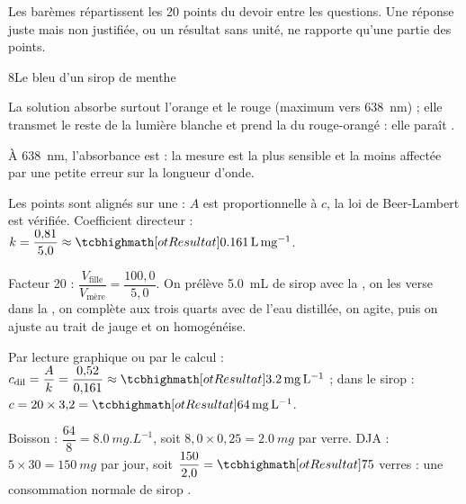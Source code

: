 
{\otLight\fontsize{8.5}{11.5}\selectfont\color{otMuted}\noindent Les barèmes répartissent les 20 points du devoir entre les
questions. Une réponse juste mais non justifiée, ou un résultat sans unité, ne rapporte qu'une partie des points.\par}

\begin{corrigeBac}{8}{Le bleu d'un sirop de menthe}
\begin{questions}
\item La solution absorbe surtout l'orange et le rouge (maximum vers \qty{638}{nm}) ; elle transmet le reste de la lumière blanche
et prend la  du rouge-orangé : elle paraît . \pts{1 pt}
\item À \qty{638}{nm}, l'absorbance est  : la mesure est la plus sensible et la moins affectée par une petite
erreur sur la longueur d'onde. \pts{1 pt}
\item Les points sont alignés sur une  : $A$ est proportionnelle à $c$, la loi de Beer-Lambert
est vérifiée. Coefficient directeur : $k=\dfrac{0{,}81}{5{,}0}\approx\res{\qty{0,161}{L.mg^{-1}}}$. 
\item Facteur 20 : $\dfrac{V_\text{fille}}{V_\text{mère}}=\dfrac{100{,}0}{5{,}0}$. On prélève \qty{5,0}{mL} de sirop avec la ,
on les verse dans la , on complète aux trois quarts avec de l'eau distillée, on agite, puis on
ajuste au trait de jauge et on homogénéise. 
\item Par lecture graphique ou par le calcul : $c_\text{dil}=\dfrac{A}{k}=\dfrac{0{,}52}{0{,}161}\approx\res{\qty{3,2}{mg.L^{-1}}}$ ; dans le sirop :
$c=20\times3{,}2=\res{\qty{64}{mg.L^{-1}}}$. 
\item Boisson : $\dfrac{64}{8}=\qty{8,0}{mg.L^{-1}}$, soit $8{,}0\times0{,}25=\qty{2,0}{mg}$ par verre. DJA : $5\times30=\qty{150}{mg}$ par jour, soit
$\dfrac{150}{2{,}0}=\res{75}$ verres : une consommation normale de sirop . 
\end{questions}
\end{corrigeBac}

